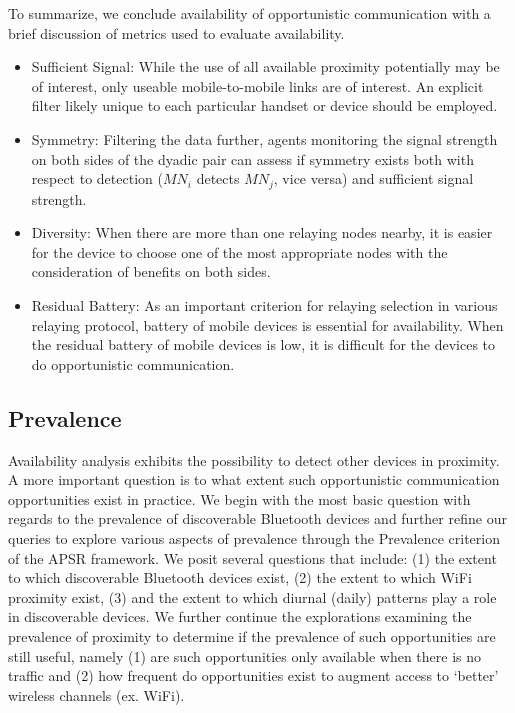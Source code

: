 To summarize, we conclude availability of opportunistic communication with a brief discussion of metrics used to evaluate availability.
\begin{itemize}
	\item Sufficient Signal: While the use of all available proximity potentially may be of interest, only useable mobile-to-mobile links are of interest.  An explicit filter likely unique to each particular handset or device should be employed.  
	\item Symmetry: Filtering the data further, agents monitoring the signal strength on both sides of the dyadic pair can assess if symmetry exists both with respect to detection ($MN_i$ detects $MN_j$, vice versa) and sufficient signal strength.  
	\item Diversity: When there are more than one relaying nodes nearby, it is easier for the device to choose one of the most appropriate nodes with the consideration of benefits on both sides. 
	\item Residual Battery: As an important criterion for relaying selection in various relaying protocol, battery of mobile devices is essential for availability. When the residual battery of mobile devices is low, it is difficult for the devices to do opportunistic communication.  
\end{itemize} 

\subsection{Prevalence}\label{sec:prevalence}
Availability analysis exhibits the possibility to detect other devices in proximity. A more important question is to what extent such opportunistic communication opportunities exist in practice.  We begin with the most basic question with regards to the prevalence of discoverable Bluetooth devices and further refine our queries to explore various aspects of prevalence through the Prevalence criterion of the APSR framework.  We posit several questions that include: (1) the extent to which discoverable Bluetooth devices exist, (2) the extent to which WiFi proximity exist, (3) and the extent to which diurnal (daily) patterns play a role in discoverable devices.  We further continue the explorations examining the prevalence of proximity to determine if the prevalence of such opportunities are still useful, namely (1) are such opportunities only available when there is no traffic and (2) how frequent do opportunities exist to augment access to `better' wireless channels (ex. WiFi).   


